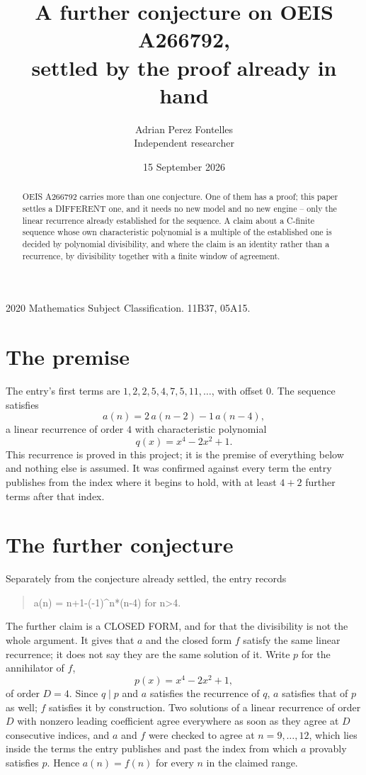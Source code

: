 \documentclass[11pt,a4paper]{article}
\title{A further conjecture on OEIS A266792,\\ \large settled by the proof already in hand}
\author{Adrian Perez Fontelles\\ \small Independent researcher}
\date{15 September 2026}
\theoremstyle{plain}
\theoremstyle{definition}
\begin{document}
\maketitle

\begin{abstract}
OEIS A266792 carries more than one conjecture. One of them has a proof; this paper settles a
DIFFERENT one, and it needs no new model and no new engine -- only the linear recurrence already
established for the sequence. A claim about a C-finite sequence whose own characteristic
polynomial is a multiple of the established one is decided by polynomial divisibility, and where
the claim is an identity rather than a recurrence, by divisibility together with a finite window
of agreement.
\end{abstract}

\noindent\small 2020 Mathematics Subject Classification. 11B37, 05A15.\normalsize

\section{The premise}

The entry's first terms are $1, 2, 2, 5, 4, 7, 5, 11,\dots$, with offset $0$. The sequence satisfies
\[
  a(n)=2\,a(n-2) - 1\,a(n-4) ,
\]
a linear recurrence of order $4$ with characteristic polynomial
\[
  q(x)=x^{4} - 2 x^{2} + 1 .
\]
This recurrence is proved in this project; it is the premise of everything below and nothing else is assumed.
It was confirmed against every term the entry publishes from the index where it begins to hold,
with at least $4+2$ further terms after that index.

\section{The further conjecture}

Separately from the conjecture already settled, the entry records

\begin{quote}\raggedright a(n) = n+1-(-1)\^{}n*(n-4) for n>4.\end{quote}

The further claim is a CLOSED FORM, and for that the divisibility is not the whole argument. It
gives that $a$ and the closed form $f$ satisfy the same linear recurrence; it does not say they
are the same solution of it. Write $p$ for the annihilator of $f$,
\[
  p(x)=x^{4} - 2 x^{2} + 1 ,
\]
of order $D=4$. Since $q\mid p$ and $a$ satisfies the recurrence of $q$, $a$ satisfies that of
$p$ as well; $f$ satisfies it by construction. Two solutions of a linear recurrence of order $D$
with nonzero leading coefficient agree everywhere as soon as they agree at $D$ consecutive
indices, and $a$ and $f$ were checked to agree at $n=9,\dots,12$,
which lies inside the terms the entry publishes and past the index from which $a$ provably
satisfies $p$. Hence $a(n)=f(n)$ for every $n$ in the claimed range.
\end{document}
